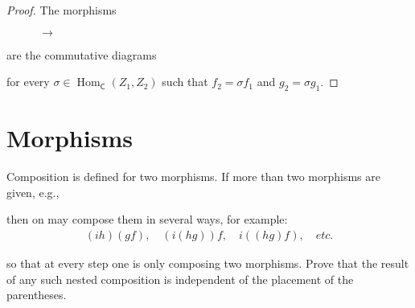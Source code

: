 \begin{proof}
	The morphisms
	\begin{figure}[htp]
		\centering
		$\longrightarrow$
	\end{figure}

	are the commutative diagrams
	\begin{figure}[htp]
		\centering
	\end{figure}

	for every $\sigma\in \operatorname{Hom}_{\mathsf{C}}(Z_{1}, Z_{2})$ such that $f_{2} = \sigma f_{1}$ and $g_{2} = \sigma g_{1}$.
\end{proof}

\section{Morphisms}

\begin{exercise}{4.1}
	Composition is defined for two morphisms. If more than two morphisms are given, e.g.,

	then on may compose them in several ways, for example:
	\begin{align*}
		(ih)(gf),\quad (i(hg))f,\quad i((hg)f),\quad etc.
	\end{align*}

	so that at every step one is only composing two morphisms. Prove that the result of any such nested composition is independent of the placement of the parentheses.
\end{exercise}

